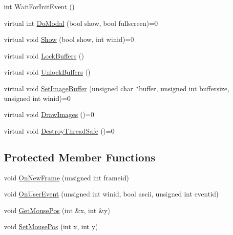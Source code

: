 \begin{DoxyCompactItemize}
int \hyperlink{classsvl_window_manager_base_a2e6ea04ac4c4403c6f442ed80b308267}{Wait\-For\-Init\-Event} ()
\item 
virtual int \hyperlink{classsvl_window_manager_base_a74b90c01c71feb43abc912d0f85b24f3}{Do\-Modal} (bool show, bool fullscreen)=0
\item 
virtual void \hyperlink{classsvl_window_manager_base_adb4ef704308882625b8a9bd5b978f408}{Show} (bool show, int winid)=0
\item 
virtual void \hyperlink{classsvl_window_manager_base_afcb9c9ab6b483e25e6e4a6be44cee53a}{Lock\-Buffers} ()
\item 
virtual void \hyperlink{classsvl_window_manager_base_a3de36fded4442ddf69cf2c9e8b2a5cfe}{Unlock\-Buffers} ()
\item 
virtual void \hyperlink{classsvl_window_manager_base_a7c9f61a0101acb234df5f8f192bd62af}{Set\-Image\-Buffer} (unsigned char $\ast$buffer, unsigned int buffersize, unsigned int winid)=0
\item 
virtual void \hyperlink{classsvl_window_manager_base_a5c285307a85fe67e084487041c82182b}{Draw\-Images} ()=0
\item 
virtual void \hyperlink{classsvl_window_manager_base_ae21e9e1b5af8e735e711422f478d335f}{Destroy\-Thread\-Safe} ()=0
\end{DoxyCompactItemize}
\subsection*{Protected Member Functions}
\begin{DoxyCompactItemize}
\item 
void \hyperlink{classsvl_window_manager_base_a1b9065121a86c241cf9623822e9dc4bd}{On\-New\-Frame} (unsigned int frameid)
\item 
void \hyperlink{classsvl_window_manager_base_a097a2e68082683d3fb50eeb7e768b2f9}{On\-User\-Event} (unsigned int winid, bool ascii, unsigned int eventid)
\item 
void \hyperlink{classsvl_window_manager_base_a08423e6af5c56905c370f9d2949a6857}{Get\-Mouse\-Pos} (int \&x, int \&y)
\item 
void \hyperlink{classsvl_window_manager_base_a73744dbd826d9b5edcb647bfd092d9a9}{Set\-Mouse\-Pos} (int x, int y)
\end{DoxyCompactItemize}
